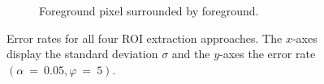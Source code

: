 \begin{figure}[H]
\begin{subfigure}[t]{0.45\linewidth}
		\caption{Foreground pixel surrounded by foreground.}
		\label{fig: alpha0.05_phi5_foreground_free}
	\end{subfigure}
	\caption{Error rates for all four ROI extraction approaches. The $x$-axes display the standard deviation $\sigma$ and the $y$-axes the error rate $(\alpha~=~0.05, \varphi~=~5)$.}
	\label{fig: alpha0.05_phi5}
\end{figure}